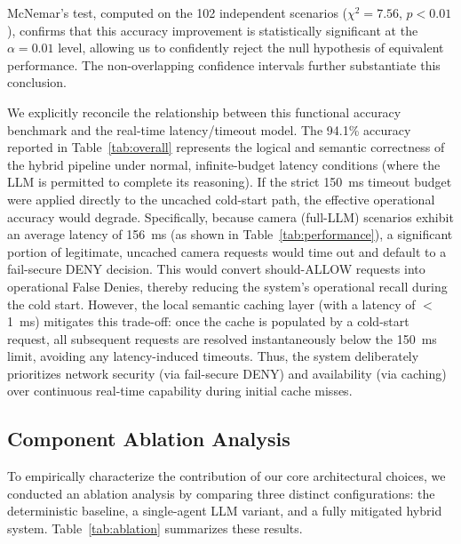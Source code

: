 \documentclass[
]{ceurart}
\begin{document}
McNemar's test, computed on the 102 independent scenarios ($\chi^2 = 7.56$, $p < 0.01$), confirms that this accuracy improvement is statistically significant at the $\alpha = 0.01$ level, allowing us to confidently reject the null hypothesis of equivalent performance. The non-overlapping confidence intervals further substantiate this conclusion.

We explicitly reconcile the relationship between this functional accuracy benchmark and the real-time latency/timeout model. The 94.1\% accuracy reported in Table~\ref{tab:overall} represents the logical and semantic correctness of the hybrid pipeline under normal, infinite-budget latency conditions (where the LLM is permitted to complete its reasoning). If the strict 150~ms timeout budget were applied directly to the uncached cold-start path, the effective operational accuracy would degrade. Specifically, because camera (full-LLM) scenarios exhibit an average latency of 156~ms (as shown in Table~\ref{tab:performance}), a significant portion of legitimate, uncached camera requests would time out and default to a fail-secure DENY decision. This would convert should-ALLOW requests into operational False Denies, thereby reducing the system's operational recall during the cold start. However, the local semantic caching layer (with a latency of $<$1~ms) mitigates this trade-off: once the cache is populated by a cold-start request, all subsequent requests are resolved instantaneously below the 150~ms limit, avoiding any latency-induced timeouts. Thus, the system deliberately prioritizes network security (via fail-secure DENY) and availability (via caching) over continuous real-time capability during initial cache misses.

\subsection{Component Ablation Analysis}

To empirically characterize the contribution of our core architectural choices, we conducted an ablation analysis by comparing three distinct configurations: the deterministic baseline, a single-agent LLM variant, and a fully mitigated hybrid system. Table~\ref{tab:ablation} summarizes these results.
\end{document}
